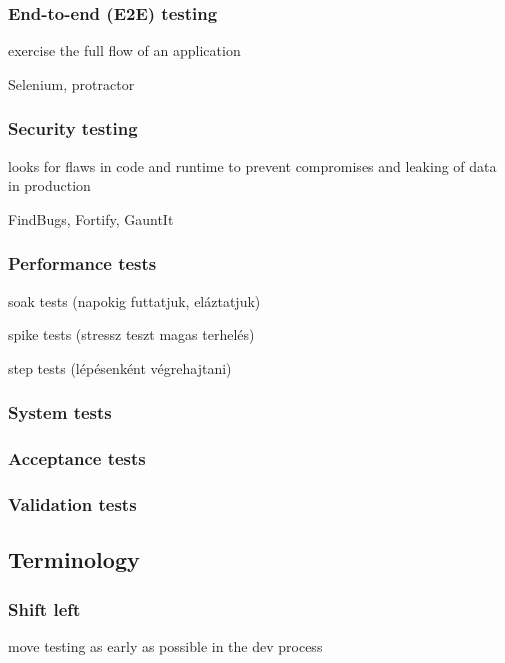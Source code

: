 \documentclass[a4paper,14pt, twocolumn]{extarticle}
\begin{document}
			\subsubsection{End-to-end (E2E) testing}
				\begin{compactitem}
					\item exercise the full flow of an application 
					\item Selenium, protractor
				\end{compactitem}
			\subsubsection{Security testing}
				\begin{compactitem}
					\item looks for flaws in code and runtime to prevent compromises and leaking of data in production 
					\item FindBugs, Fortify, GauntIt
				\end{compactitem}
			\subsubsection{Performance tests}
				\begin{compactitem}
					\item soak tests (napokig futtatjuk, eláztatjuk)
					\item spike tests (stressz teszt magas terhelés)
					\item step tests (lépésenként végrehajtani)
				\end{compactitem}
			\subsubsection{System tests }
			\subsubsection{Acceptance tests }
			\subsubsection{Validation tests}

		\subsection{Terminology}
			\subsubsection{Shift left}
				move testing as early as possible in the dev process
\end{document}
